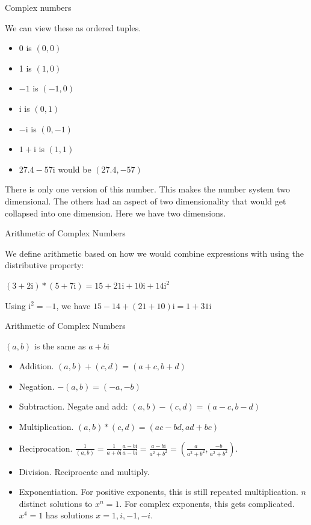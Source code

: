 \documentclass{beamer}
\begin{document}
\begin{frame}{Complex numbers}

We can view these as ordered tuples. 

\begin{itemize}
    \item 0 is  $(0,0)$
    \item 1 is  $(1,0)$
    \item $-1$ is $(-1,0)$
    \item $\mathrm{i}$ is $(0,1)$
    \item $-\mathrm{i}$ is $(0, -1)$
    \item $1+\mathrm{i}$ is $(1,1)$
    \item $27.4 -57 \mathrm{i}$ would be $(27.4, -57)$
\end{itemize}

There is only one version of this number. This makes the number system two dimensional. The others had an aspect of two dimensionality that would get collapsed into one dimension. Here we have two dimensions. 


\end{frame}

\begin{frame}{Arithmetic of Complex Numbers}

We define arithmetic based on how we would combine expressions with using the distributive property: 

$ (3 + 2\mathrm{i})*(5 + 7\mathrm{i}) 
 =  15 +21 \mathrm{i} + 10 \mathrm{i} + 14 \mathrm{i}^2 $

Using $\mathrm{i}^2 = -1$, we have  $ 15 - 14 + (21 +10) \mathrm{i} = 1 + 31\mathrm{i} $
 
\end{frame}

\begin{frame}{Arithmetic of Complex Numbers}

$(a,b)$ is the same as $a + b \mathrm{i}$

\begin{itemize}
\item Addition.  $(a,b) + (c,d) = (a+c, b+d)$
\item Negation. $-(a,b) = (-a, -b)$
\item Subtraction. Negate and add:  $(a,b) - (c,d) = (a-c, b-d)$
\item Multiplication.  $(a,b)*(c,d) = (ac - bd, ad + bc)$
\item Reciprocation. $\frac{1}{(a,b)} = \frac{1}{a+b \mathrm{i}} \frac{a-b\mathrm{i}}{a - b \mathrm{i}} =  \frac{a - b \mathrm{i}}{a^2 + b^2} = (\frac{a}{a^2+b^2}, \frac{-b}{a^2+b^2})$.
\item Division. Reciprocate and multiply. 
\item Exponentiation. For positive exponents, this is still repeated multiplication. $n$ distinct solutions to $x^n = 1$. For complex exponents, this gets complicated.  $x^4 = 1$ has solutions $x=1, i, -1, -i$.
\end{itemize} 

\end{frame}
\end{document}
